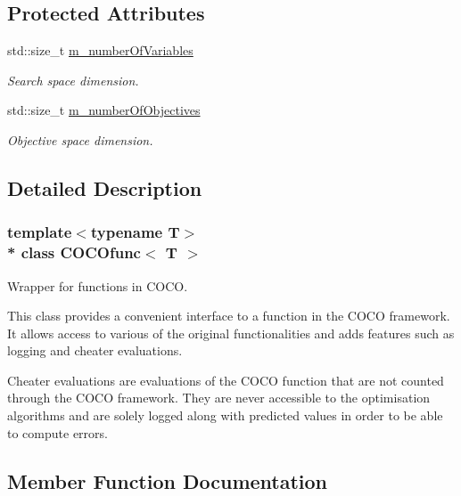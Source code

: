 \subsection*{Protected Attributes}
\begin{DoxyCompactItemize}
\item 
std\+::size\+\_\+t \hyperlink{classCOCOfunc_a7853670ae89b8a69629c91dea2e97b94}{m\+\_\+number\+Of\+Variables}\hypertarget{classCOCOfunc_a7853670ae89b8a69629c91dea2e97b94}{}\label{classCOCOfunc_a7853670ae89b8a69629c91dea2e97b94}

\begin{DoxyCompactList}\small\item\em Search space dimension. \end{DoxyCompactList}\item 
std\+::size\+\_\+t \hyperlink{classCOCOfunc_a73fcef890a91b71bd3dacc34487551c7}{m\+\_\+number\+Of\+Objectives}\hypertarget{classCOCOfunc_a73fcef890a91b71bd3dacc34487551c7}{}\label{classCOCOfunc_a73fcef890a91b71bd3dacc34487551c7}

\begin{DoxyCompactList}\small\item\em Objective space dimension. \end{DoxyCompactList}\end{DoxyCompactItemize}


\subsection{Detailed Description}
\subsubsection*{template$<$typename T$>$\\*
class C\+O\+C\+Ofunc$<$ T $>$}

Wrapper for functions in C\+O\+CO. 

This class provides a convenient interface to a function in the C\+O\+CO framework. It allows access to various of the original functionalities and adds features such as logging and cheater evaluations.

Cheater evaluations are evaluations of the C\+O\+CO function that are not counted through the C\+O\+CO framework. They are never accessible to the optimisation algorithms and are solely logged along with predicted values in order to be able to compute errors. 

\subsection{Member Function Documentation}
